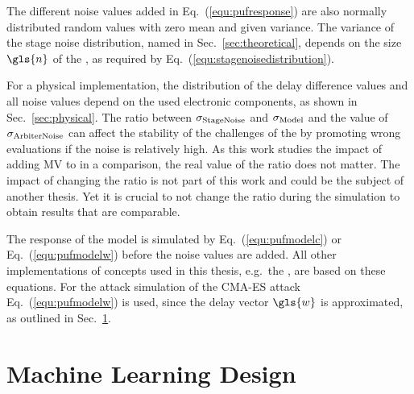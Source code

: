 The different noise values added in Eq.\ (\ref{equ:pufresponse}) are also normally distributed random values with zero mean and given variance.
The variance of the stage noise distribution, named in Sec.\ \ref{sec:theoretical}, depends on the size $\gls{n}$ of the \apuf, as required by Eq.\ (\ref{equ:stagenoisedistribution}).

For a physical \apuf implementation, the distribution of the delay difference values and all noise values depend on the used electronic components, as shown in Sec.\ \ref{sec:physical}.
The ratio between $\sigma_{\mathrm{Stage Noise}}$ and $\sigma_{\mathrm{Model}}$ and the value of $\sigma_{\mathrm{Arbiter Noise}}$ can affect the stability of the challenges of the \apuf by promoting wrong \puf evaluations if the noise is relatively high.
As this work studies the impact of adding \ac{MV} to \apufs in a comparison, the real value of the ratio does not matter.
The impact of changing the ratio is not part of this work and could be the subject of another thesis. 
Yet it is crucial to not change the ratio during the simulation to obtain results that are comparable.

The response of the \apuf model is simulated by Eq.\ (\ref{equ:pufmodelc}) or Eq.\ (\ref{equ:pufmodelw}) before the noise values are added.
All other implementations of \puf concepts used in this thesis, e.g.\ the \mpuf, are based on these \apuf equations.
For the attack simulation of the \ac{CMA-ES} attack Eq.\ (\ref{equ:pufmodelw}) is used, since the delay vector $\gls{w}$ is approximated, as outlined in Sec.\ \ref{sec:machinelearningdesign}.


\section{Machine Learning Design}
\label{sec:machinelearningdesign}

